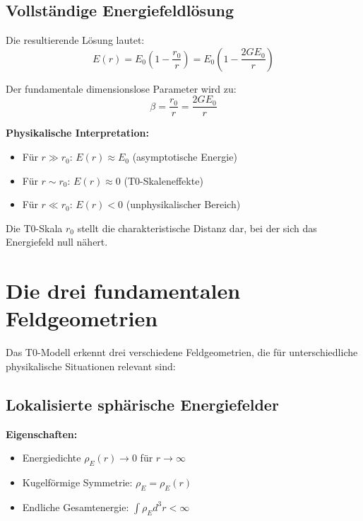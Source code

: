 \documentclass[12pt,a4paper]{report}
\newcommand{\rzero}{r_0}                  %
\begin{document}
	\subsection{Vollständige Energiefeldlösung}
	\label{subsec:complete_solution}
	
	Die resultierende Lösung lautet:
	\begin{equation}
		\boxed{E(r) = E_0\left(1 - \frac{\rzero}{r}\right) = E_0\left(1 - \frac{2GE_0}{r}\right)}
		\label{eq:complete_energy_solution}
	\end{equation}
	
	Der fundamentale dimensionslose Parameter wird zu:
	\begin{equation}
		\beta = \frac{\rzero}{r} = \frac{2GE_0}{r}
	\end{equation}
	
	\textbf{Physikalische Interpretation:}
	\begin{itemize}
		\item Für $r \gg \rzero$: $E(r) \approx E_0$ (asymptotische Energie)
		\item Für $r \sim \rzero$: $E(r) \approx 0$ (T0-Skaleneffekte)
		\item Für $r \ll \rzero$: $E(r) < 0$ (unphysikalischer Bereich)
	\end{itemize}
	
	Die T0-Skala $\rzero$ stellt die charakteristische Distanz dar, bei der sich das Energiefeld null nähert.
	
	\section{Die drei fundamentalen Feldgeometrien}
	\label{sec:three_field_geometries}
	
	Das T0-Modell erkennt drei verschiedene Feldgeometrien, die für unterschiedliche physikalische Situationen relevant sind:
	
	\subsection{Lokalisierte sphärische Energiefelder}
	\label{subsec:localized_spherical}
	
	\textbf{Eigenschaften:}
	\begin{itemize}
		\item Energiedichte $\rho_E(r) \to 0$ für $r \to \infty$
		\item Kugelförmige Symmetrie: $\rho_E = \rho_E(r)$
		\item Endliche Gesamtenergie: $\int \rho_E d^3r < \infty$
	\end{itemize}
	
\end{document}
